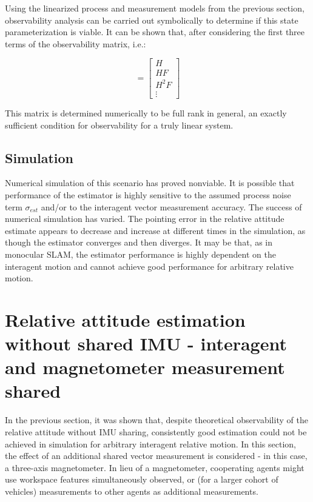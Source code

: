\documentclass{aiaa-tc}
\begin{document}
Using the linearized process and measurement models from the previous section, observability analysis can be carried out symbolically to determine if this state parameterization is viable. It can be shown that, after considering the first three terms of the observability matrix, i.e.:

\begin{equation}
[O] = \begin{bmatrix}
H\\
HF\\
H^2F\\
\vdots
\end{bmatrix}
\end{equation}

This matrix is determined numerically to be full rank in general, an exactly sufficient condition for observability for a truly linear system.

\subsection{Simulation}

Numerical simulation of this scenario has proved nonviable. It is possible that performance of the estimator is highly sensitive to the assumed process noise term $\sigma_{est}$ and/or to the interagent vector measurement accuracy. The success of numerical simulation has varied. The pointing error in the relative attitude estimate appears to decrease and increase at different times in the simulation, as though the estimator converges and then diverges. It may be that, as in monocular SLAM, the estimator performance is highly dependent on the interagent motion and cannot achieve good performance for arbitrary relative motion.

\section{Relative attitude estimation without shared IMU - interagent and magnetometer measurement shared}

In the previous section, it was shown that, despite theoretical observability of the relative attitude without IMU sharing, consistently good estimation could not be achieved in simulation for arbitrary interagent relative motion. In this section, the effect of an additional shared vector measurement is considered - in this case, a three-axis magnetometer. In lieu of a magnetometer, cooperating agents might use workspace features simultaneously observed, or (for a larger cohort of vehicles) measurements to other agents as additional measurements.
\end{document}
